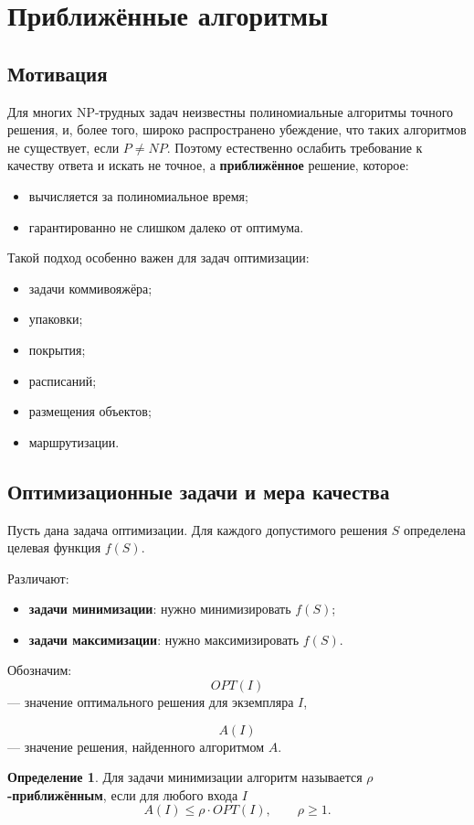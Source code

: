 \documentclass[12pt,a4paper]{article}
\theoremstyle{definition}
\newtheorem{definition}{Определение}[section]
\theoremstyle{plain}
\begin{document}
\section{Приближённые алгоритмы}

\subsection{Мотивация}
Для многих NP-трудных задач неизвестны полиномиальные алгоритмы точного решения, и, более того, широко распространено убеждение, что таких алгоритмов не существует, если $P\ne NP$. Поэтому естественно ослабить требование к качеству ответа и искать не точное, а \textbf{приближённое} решение, которое:
\begin{itemize}
\item вычисляется за полиномиальное время;
\item гарантированно не слишком далеко от оптимума.
\end{itemize}

Такой подход особенно важен для задач оптимизации:
\begin{itemize}
\item задачи коммивояжёра;
\item упаковки;
\item покрытия;
\item расписаний;
\item размещения объектов;
\item маршрутизации.
\end{itemize}

\subsection{Оптимизационные задачи и мера качества}
Пусть дана задача оптимизации. Для каждого допустимого решения $S$ определена целевая функция $f(S)$.

Различают:
\begin{itemize}
\item \textbf{задачи минимизации}: нужно минимизировать $f(S)$;
\item \textbf{задачи максимизации}: нужно максимизировать $f(S)$.
\end{itemize}

Обозначим:
\[
OPT(I)
\]
--- значение оптимального решения для экземпляра $I$,

\[
A(I)
\]
--- значение решения, найденного алгоритмом $A$.

\begin{definition}
Для задачи минимизации алгоритм называется \textbf{$\rho$-приближённым}, если для любого входа $I$
\[
A(I)\le \rho\cdot OPT(I), \qquad \rho\ge 1.
\]
\end{definition}
\end{document}
